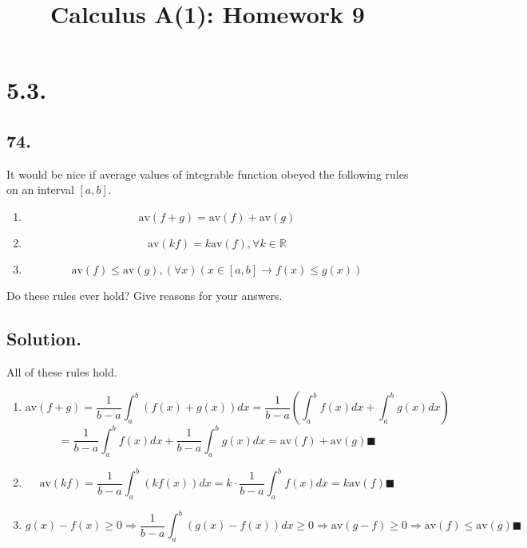 \documentclass{article}
\title{Calculus A(1): Homework 9}
\begin{document}
\maketitle
\section*{5.3.}
\subsection*{74.}
It would be nice if average values of integrable function obeyed the following rules on an interval $[a,b]$.
\begin{enumerate} [label=\textbf{\alph*.}]
    \item \[\mathrm{av}(f+g)=\mathrm{av}(f)+\mathrm{av}(g)\]
    \item \[\mathrm{av}(kf)=k\mathrm{av}(f),\forall k\in \mathbb{R}\]
    \item \[\mathrm{av}(f)\leq \mathrm{av}(g),(\forall x)(x\in[a,b]\rightarrow f(x)\leq g(x))\]
\end{enumerate}
Do these rules ever hold? Give reasons for your answers.
\subsection*{Solution.}
All of these rules hold.
\begin{enumerate}  [label=\textbf{\alph*.}]
    \item \[\mathrm{av}(f+g)=\frac{1}{b-a}\int _a^b(f(x)+g(x))dx=\frac{1}{b-a}\left(\int_a^b f(x)dx+\int_a^b g(x)dx\right)\]
    \[=\frac{1}{b-a}\int_a^b f(x)dx+\frac{1}{b-a}\int_a^b g(x)dx=\mathrm{av}(f)+\mathrm{av}(g)\blacksquare\]
    \item \[\mathrm{av}(kf)=\frac{1}{b-a}\int_a^b(kf(x))dx=k\cdot\frac{1}{b-a}\int_a^b f(x)dx=k\mathrm{av}(f)\blacksquare\]
    \item \[g(x)-f(x)\geq 0\Rightarrow \frac{1}{b-a}\int _a^b(g(x)-f(x))dx\geq 0\Rightarrow \mathrm{av}(g-f)\geq 0\Rightarrow \mathrm{av}(f)\leq \mathrm{av}(g)\blacksquare\]
\end{enumerate}
\end{document}
